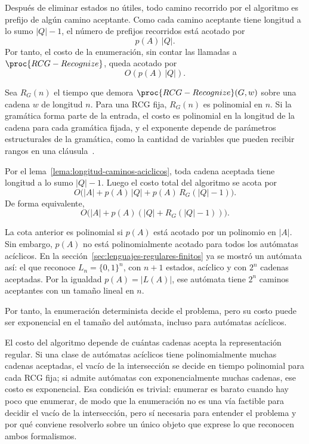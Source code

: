 Después de eliminar estados no útiles, todo camino recorrido por el
algoritmo es prefijo de algún camino aceptante. Como cada camino
aceptante tiene longitud a lo sumo $|Q|-1$, el número de prefijos
recorridos está acotado por
\[
  p(A)\,|Q|.
\]
Por tanto, el costo de la enumeración, sin contar las llamadas a
$\proc{RCG-Recognize}$, queda acotado por
\[
  O(p(A)\,|Q|).
\]

Sea $R_G(n)$ el tiempo que demora
$\proc{RCG-Recognize}(G,w)$ sobre una cadena $w$ de longitud $n$. Para
una RCG fija, $R_G(n)$ es polinomial en $n$. Si la gramática forma parte
de la entrada, el costo es polinomial en la longitud de la cadena para
cada gramática fijada, y el exponente depende de parámetros
estructurales de la gramática, como la cantidad de variables que pueden
recibir rangos en una cláusula~\cite{boullier1998proposal,kallmeyer2010parsing}.

Por el lema~\ref{lema:longitud-caminos-aciclicos}, toda cadena aceptada
tiene longitud a lo sumo $|Q|-1$. Luego el costo total del algoritmo se
acota por
\[
  O\bigl( |A| + p(A)\,|Q| + p(A)\,R_G(|Q|-1) \bigr).
\]
De forma equivalente,
\[
  O\bigl( |A| + p(A)(|Q| + R_G(|Q|-1)) \bigr).
\]

La cota anterior es polinomial si $p(A)$ está acotado por un polinomio
en $|A|$. Sin embargo, $p(A)$ no está polinomialmente acotado para todos
los autómatas acíclicos. En la
sección~\ref{sec:lenguajes-regulares-finitos} ya se mostró un
autómata así: el que reconoce $L_n=\{0,1\}^n$, con $n+1$ estados,
acíclico y con $2^n$ cadenas aceptadas. Por la igualdad $p(A)=|L(A)|$,
ese autómata tiene $2^n$ caminos aceptantes con un tamaño lineal en $n$.

Por tanto, la enumeración determinista decide el problema, pero su
costo puede ser exponencial en el tamaño del autómata, incluso para
autómatas acíclicos.

El costo del algoritmo depende de cuántas cadenas acepta la
representación regular. Si una clase de autómatas acíclicos tiene
polinomialmente muchas cadenas aceptadas, el vacío de la intersección
se decide en tiempo polinomial para cada RCG fija; si admite autómatas
con exponencialmente muchas cadenas, ese costo es exponencial. Esa
condición es trivial: enumerar es barato cuando hay poco que enumerar,
de modo que la enumeración no es una vía factible para decidir el
vacío de la intersección, pero sí necesaria para entender el problema
y por qué conviene resolverlo sobre un único objeto que exprese lo que
reconocen ambos formalismos.

